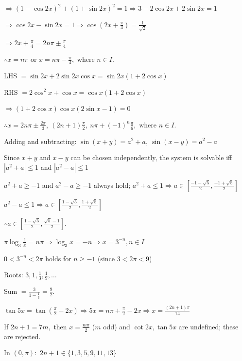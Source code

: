   $\Rightarrow (1 - \cos2x)^2 + (1 + \sin2x)^2 = 1 \Rightarrow 3 - 2\cos2x + 2\sin2x = 1$

  $\Rightarrow \cos2x - \sin2x = 1 \Rightarrow \cos\left(2x + \frac{\pi}{4}\right) = \frac{1}{\sqrt{2}}$

  $\Rightarrow 2x + \frac{\pi}{4} = 2n\pi\pm\frac{\pi}{4}$

  $\therefore x = n\pi$ or $x = n\pi - \frac{\pi}{4},$ where $n\in I.$

\item LHS $= \sin2x + 2\sin2x\cos x = \sin2x(1 + 2\cos x)$

  RHS $= 2\cos^2x + \cos x = \cos x(1 + 2\cos x)$

  $\Rightarrow (1 + 2\cos x)\cos x(2\sin x - 1) = 0$

  $\therefore x = 2n\pi\pm\frac{2\pi}{3},~(2n + 1)\frac{\pi}{2},~n\pi + (-1)^n\frac{\pi}{6},$ where $n\in I.$

\item Adding and subtracting: $\sin(x + y) = a^2 + a,~\sin(x - y) = a^2 - a$

  Since $x + y$ and $x - y$ can be chosen independently, the system is solvable iff $|a^2 + a|\leq 1$ and $|a^2 - a|\leq 1$

  $a^2 + a\geq -1$ and $a^2 - a\geq -1$ always hold; $a^2 + a\leq 1\Rightarrow a\in\left[\frac{-1 - \sqrt{5}}{2}, \frac{-1 +
  \sqrt{5}}{2}\right]$

  $a^2 - a\leq 1\Rightarrow a\in\left[\frac{1 - \sqrt{5}}{2}, \frac{1 + \sqrt{5}}{2}\right]$

  $\therefore a\in\left[\frac{1 - \sqrt{5}}{2}, \frac{\sqrt{5} - 1}{2}\right].$

\item $\pi\log_3\frac{1}{x} = n\pi \Rightarrow \log_3x = -n \Rightarrow x = 3^{-n}, n\in I$

  $0 < 3^{-n} < 2\pi$ holds for $n\geq -1$ (since $3 < 2\pi < 9$)

  Roots: $3, 1, \frac{1}{3}, \frac{1}{9}, \ldots$

  Sum $= \frac{3}{1 - \frac{1}{3}} = \frac{9}{2}.$

\item $\tan5x = \tan\left(\frac{\pi}{2} - 2x\right) \Rightarrow 5x = n\pi + \frac{\pi}{2} - 2x \Rightarrow x =
  \frac{(2n + 1)\pi}{14}$

  If $2n + 1 = 7m,$ then $x = \frac{m\pi}{2}$ ($m$ odd) and $\cot2x,\tan5x$ are undefined; these are rejected.

  In $(0, \pi):$ $2n + 1\in\{1, 3, 5, 9, 11, 13\}$

